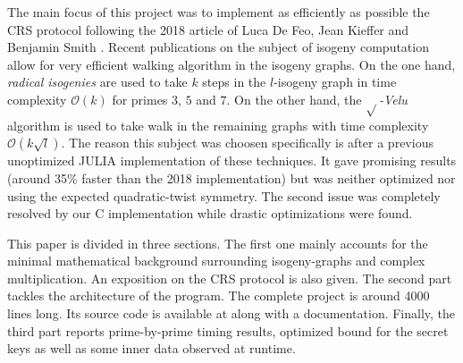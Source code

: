 \documentclass[../main.tex]{subfiles}
\begin{document}
The main focus of this project was to implement as efficiently as possible the CRS protocol following the 2018 article of Luca De Feo, Jean Kieffer and Benjamin Smith \cite{}.
Recent publications on the subject of isogeny computation allow for very efficient walking algorithm in the isogeny graphs.
On the one hand, \textit{radical isogenies} \cite{} are used to take $k$ steps in the $l$-isogeny graph in time complexity $\mathcal{O}(k)$ for primes $3$, $5$ and $7$.
On the other hand, the $\sqrt{}$\textit{-Velu} algorithm \cite{} is used to take walk in the remaining graphs with time complexity $\mathcal{O}(k\sqrt{l})$.
The reason this subject was choosen specifically is after a previous unoptimized JULIA implementation of these techniques.
It gave promising results (around 35\% faster than the 2018 implementation) but was neither optimized nor using the expected quadratic-twist symmetry.
The second issue was completely resolved by our C implementation while drastic optimizations were found.

This paper is divided in three sections.
The first one mainly accounts for the minimal mathematical background surrounding isogeny-graphs and complex multiplication.
An exposition on the CRS protocol is also given.
The second part tackles the architecture of the program.
The complete project is around 4000 lines long.
Its source code is available at \cite{} along with a documentation.
Finally, the third part reports prime-by-prime timing results, optimized bound for the secret keys as well as some inner data observed at runtime.
\end{document}
